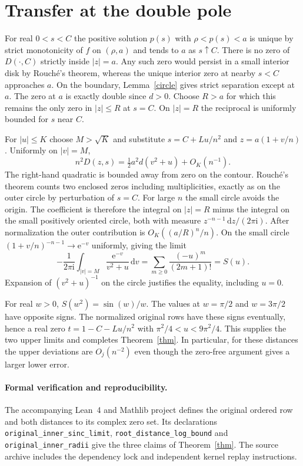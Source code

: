 \documentclass[11pt]{article}
\newcommand{\ee}{\mathrm e}
\newcommand{\ii}{\mathrm i}
\newcommand{\dd}{\,\mathrm d}
\begin{document}
\section{Transfer at the double pole}
For real $0<s<C$ the positive solution $p(s)$ with $\rho<p(s)<a$ is unique by strict monotonicity of $f$ on $(\rho,a)$ and tends to $a$ as $s\uparrow C$. There is no zero of $D(\cdot,C)$ strictly inside $|z|=a$. Any such zero would persist in a small interior disk by Rouch\'e's theorem, whereas the unique interior zero at nearby $s<C$ approaches $a$. On the boundary, Lemma~\ref{circle} gives strict separation except at $a$. The zero at $a$ is exactly double since $d>0$. Choose $R>a$ for which this remains the only zero in $|z|\le R$ at $s=C$. On $|z|=R$ the reciprocal is uniformly bounded for $s$ near $C$.

For $|u|\le K$ choose $M>\sqrt K$ and substitute $s=C+Lu/n^2$ and $z=a(1+v/n)$. Uniformly on $|v|=M$,
\[
 n^2D(z,s)=\tfrac12a^2d(v^2+u)+O_K(n^{-1}).
\]
The right-hand quadratic is bounded away from zero on the contour. Rouch\'e's theorem counts two enclosed zeros including multiplicities, exactly as on the outer circle by perturbation of $s=C$. For large $n$ the small circle avoids the origin. The coefficient is therefore the integral on $|z|=R$ minus the integral on the small positively oriented circle, both with measure $z^{-n-1}\dd z/(2\pi\ii)$. After normalization the outer contribution is $O_K((a/R)^n/n)$. On the small circle $(1+v/n)^{-n-1}\to\ee^{-v}$ uniformly, giving the limit
\[
 -\frac1{2\pi\ii}\int_{|v|=M}\frac{\ee^{-v}}{v^2+u}\dd v
 =\sum_{m\ge0}\frac{(-u)^m}{(2m+1)!}=S(u).
\]
Expansion of $(v^2+u)^{-1}$ on the circle justifies the equality, including $u=0$.

For real $w>0$, $S(w^2)=\sin(w)/w$. The values at $w=\pi/2$ and $w=3\pi/2$ have opposite signs. The normalized original rows have these signs eventually, hence a real zero $t=1-C-Lu/n^2$ with $\pi^2/4<u<9\pi^2/4$. This supplies the two upper limits and completes Theorem~\ref{thm}. In particular, for these distances the upper deviations are $O_j(n^{-2})$ even though the zero-free argument gives a larger lower error.

\paragraph{Formal verification and reproducibility.}
The accompanying Lean~4 and Mathlib project defines the original ordered row and both distances to its complex zero set. Its declarations \texttt{original\_inner\_sinc\_limit}, \texttt{root\_distance\_log\_bound} and \texttt{original\_inner\_radii} give the three claims of Theorem~\ref{thm}. The source archive includes the dependency lock and independent kernel replay instructions.
\end{document}
